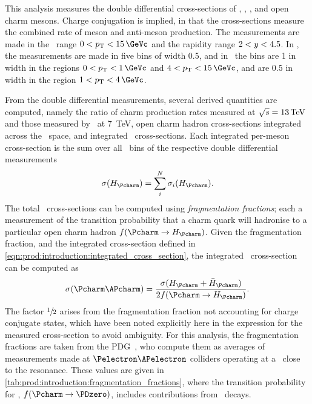 This analysis measures the double differential cross-sections of \PDzero, \PDp, 
\PDsplus, and \PDstarp open charm mesons.
Charge conjugation is implied, in that the cross-sections measure the combined 
rate of meson and anti-meson production.
The measurements are made in the \pT\ range $0 < \pT < \SI{15}{\GeVc}$ and the 
rapidity range $2 < y < 4.5$.
In \rapidity, the measurements are made in five bins of width 0.5, and in \pT\ 
the bins are \SI{1}{\GeVc} in width in the regions $0 < \pT < \SI{1}{\GeVc}$ 
and $4 < \pT < \SI{15}{\GeVc}$, and are \SI{0.5}{\GeVc} in width in the region 
$1 < \pT < \SI{4}{\GeVc}$.

From the double differential measurements, several derived quantities are 
computed, namely the ratio of charm production rates measured at $\sqrts = 
\SI{13}{\TeV}$ and those measured by \lhcb\ at \SI{7}{\TeV}, open charm hadron 
cross-sections integrated across the \pTy\ space, and integrated \ccbar\ 
cross-sections.
Each integrated per-meson cross-section is the sum over all \pTy\ bins of the 
respective double differential measurements
\begin{equation}
  \xsec{(\PHc)} =
    \sum_{i}^{N} \xsec_{i}(\PHc).
  \label{eqn:prod:introduction:integrated_cross_section}
\end{equation}
The total \ccbar\ cross-sections can be computed using \emph{fragmentation 
  fractions}; each a measurement of the transition probability that a charm 
quark will hadronise to a particular open charm hadron $f(\cToHc)$.
Given the fragmentation fraction, and the integrated cross-section defined in 
\cref{eqn:prod:introduction:integrated_cross_section}, the integrated \ccbar\ 
cross-section can be computed as
\begin{equation}
  \xsec{(\ccbar)} = \frac{\xsec(\PHc + \APHc)}{2f(\cToHc)}.
  \label{eqn:prod:introduction:ccbar_cross_section}
\end{equation}
The factor $\sfrac{1}{2}$ arises from the fragmentation fraction not accounting 
for charge conjugate states, which have been noted explicitly here in the 
expression for the measured cross-section to avoid ambiguity.
For this analysis, the fragmentation fractions are taken from the 
\ac{PDG}~\cite{PDG2008}, who compute them as averages of measurements made at 
$\Pelectron\APelectron$ colliders operating at a \sqrts\ close to the 
\PUpsilonFourS resonance.
These values are given in \cref{tab:prod:introduction:fragmentation_fractions}, 
where the transition probability for \PDzero, $f(\decay{\Pcharm}{\PDzero})$, 
includes contributions from \DstToDzpi\ decays.

